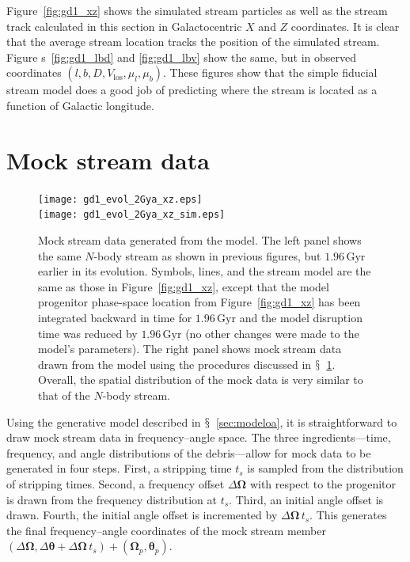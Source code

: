 \documentclass{emulateapj}
\renewcommand{\figurename}{Figure}
\newcommand{\sectionname}{$\mathsection$}
\renewcommand{\vec}[1]{\ensuremath{\mathbf{#1}}}
\newcommand{\veco}{\ensuremath{\vec{\Omega}}}
\newcommand{\veca}{\ensuremath{\boldsymbol\theta}}
\newcommand{\Gyr}{\ensuremath{\,\mathrm{Gyr}}}
\newcommand{\vlos}{\ensuremath{V_{\mathrm{los}}}}
\newcommand{\pmll}{\ensuremath{\mu_l}}
\newcommand{\pmbb}{\ensuremath{\mu_b}}
\begin{document}
\figurename~\ref{fig:gd1_xz} shows the simulated stream particles as
well as the stream track calculated in this section in Galactocentric
$X$ and $Z$ coordinates. It is clear that the average stream location
tracks the position of the simulated stream. \figurename
s~\ref{fig:gd1_lbd} and \ref{fig:gd1_lbv} show the same, but in
observed coordinates $(l,b,D,\vlos,\pmll,\pmbb)$. These figures show
that the simple fiducial stream model does a good job of predicting
where the stream is located as a function of Galactic longitude. 



\section{Mock stream data}\label{sec:mock}

\begin{figure}[t!]
 \texttt{[image: gd1\_evol\_2Gya\_xz.eps]}\\
 \texttt{[image: gd1\_evol\_2Gya\_xz\_sim.eps]}
  \caption{Mock stream data generated from the model. The left panel
    shows the same $N$-body stream as shown in previous figures, but
    $1.96\Gyr$ earlier in its evolution. Symbols, lines, and the
    stream model are the same as those in
    \figurename~\ref{fig:gd1_xz}, except that the model progenitor
    phase-space location from \figurename~\ref{fig:gd1_xz} has been
    integrated backward in time for $1.96\Gyr$ and the model
    disruption time was reduced by $1.96\Gyr$ (no other changes were
    made to the model's parameters). The right panel shows mock stream
    data drawn from the model using the procedures discussed in
    \sectionname~\ref{sec:mock}. Overall, the spatial distribution of
    the mock data is very similar to that of the $N$-body
    stream.}\label{fig:gd1_mock}
\end{figure}

Using the generative model described in
\sectionname~\ref{sec:modeloa}, it is straightforward to draw mock
stream data in frequency--angle space. The three ingredients---time,
frequency, and angle distributions of the debris---allow for mock data
to be generated in four steps. First, a stripping time $t_s$ is
sampled from the distribution of stripping times. Second, a frequency
offset $\Delta \veco$ with respect to the progenitor is drawn from the
frequency distribution at $t_s$. Third, an initial angle offset is
drawn. Fourth, the initial angle offset is incremented by $\Delta
\veco \,t_s$. This generates the final frequency--angle coordinates of
the mock stream member $(\Delta \veco,\Delta \veca+\Delta \veco\,t_s)
+ (\veco_p,\veca_p)$.
\end{document}
